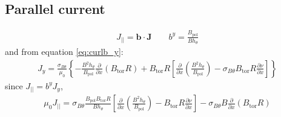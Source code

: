 \documentclass[12pt]{article}
\newcommand{\sbt}{\ensuremath{\sigma_{B\theta}}}
\newcommand{\deriv}[2]{\ensuremath{\frac{\partial #1}{\partial #2}}}
\newcommand{\hthe}{\ensuremath{h_\theta}}
\newcommand{\Bp}{\ensuremath{B_{\text{pol}}}}
\newcommand{\Bt}{\ensuremath{B_{\text{tor}}}}
\newcommand{\ve}[1]{\ensuremath{\boldsymbol{#1}}}
\newcommand{\bvec}{\ve{b}}
\newcommand{\Jvec}{\ve{J}}
\begin{document}
\subsection{Parallel current}
\begin{align*}
J_{||} = \bvec\cdot\Jvec \qquad b^y = \frac{\Bp}{B\hthe}
\end{align*}
%
and from equation \ref{eq:curlb_y}:
%
\begin{align*}
J_y = \frac{\sbt}{\mu_0}\left\{-\frac{B^2\hthe}{\Bp}\deriv{}{x}\left(\Bt
R\right) + \Bt R\left[\deriv{}{x}\left(\frac{B^2\hthe}{\Bp}\right) - \sbt\Bt
R\deriv{\nu}{x}\right]\right\}
\end{align*}
%
since $J_{||} = b^yJ_y$,
%
\begin{align*}
\mu_0 J_{||} =\sbt\frac{\Bp\Bt
R}{B\hthe}\left[\deriv{}{x}\left(\frac{B^2\hthe}{\Bp}\right) - \Bt
R\deriv{\nu}{x}\right] - \sbt B\deriv{}{x}\left(\Bt R\right)
\end{align*}
%
\end{document}
